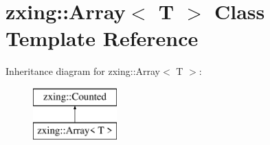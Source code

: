 \hypertarget{classzxing_1_1_array}{}\section{zxing\+:\+:Array$<$ T $>$ Class Template Reference}
\label{classzxing_1_1_array}
Inheritance diagram for zxing\+:\+:Array$<$ T $>$\+:\begin{figure}[H]
\begin{center}
\leavevmode
\includegraphics[height=2.000000cm]{classzxing_1_1_array}
\end{center}
\end{figure}
